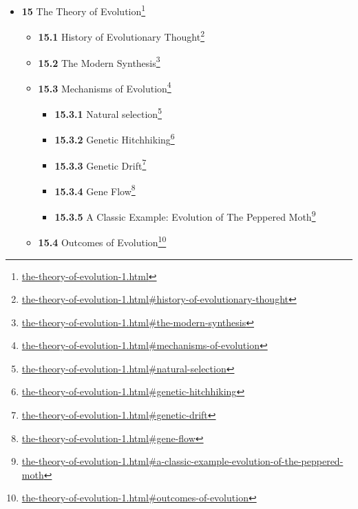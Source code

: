 \documentclass[
]{article}
\providecommand{\tightlist}{%
  \setlength{\itemsep}{0pt}\setlength{\parskip}{0pt}}
\providecommand{\tightlist}{%
  \setlength{\itemsep}{0pt}\setlength{\parskip}{0pt}}
\let\rmarkdownfootnote\footnote%
\def\footnote{\protect\rmarkdownfootnote}
\renewcommand{\href}[2]{#2\footnote{\url{#1}}}
\theoremstyle{definition}
\theoremstyle{definition}
\theoremstyle{definition}
\theoremstyle{remark}
\begin{document}
\begin{itemize}
  \begin{itemize}
  \tightlist
  \item
    \href{protists.html\#protozoa}{\emph{}\textbf{14.1} Protozoa}
  \item
    \href{protists.html\#flagellates}{\emph{}\textbf{14.2} Flagellates}
  \item
    \href{protists.html\#ciliates}{\emph{}\textbf{14.3} Ciliates}
  \item
    \href{protists.html\#amoebozoa}{\emph{}\textbf{14.4} Amoebozoa}
  \item
    \href{protists.html\#algae}{\emph{}\textbf{14.5} Algae}
  \item
    \href{protists.html\#slime-molds}{\emph{}\textbf{14.6} Slime Molds}

    \begin{itemize}
    \tightlist
    \item
      \href{protists.html\#reproduction-of-protists}{\emph{}\textbf{14.6.1}
      Reproduction of Protists}
    \end{itemize}
  \end{itemize}
\item
  \href{the-theory-of-evolution-1.html}{\emph{}\textbf{15} The Theory of
  Evolution}

  \begin{itemize}
  \tightlist
  \item
    \href{the-theory-of-evolution-1.html\#history-of-evolutionary-thought}{\emph{}\textbf{15.1}
    History of Evolutionary Thought}
  \item
    \href{the-theory-of-evolution-1.html\#the-modern-synthesis}{\emph{}\textbf{15.2}
    The Modern Synthesis}
  \item
    \href{the-theory-of-evolution-1.html\#mechanisms-of-evolution}{\emph{}\textbf{15.3}
    Mechanisms of Evolution}

    \begin{itemize}
    \tightlist
    \item
      \href{the-theory-of-evolution-1.html\#natural-selection}{\emph{}\textbf{15.3.1}
      Natural selection}
    \item
      \href{the-theory-of-evolution-1.html\#genetic-hitchhiking}{\emph{}\textbf{15.3.2}
      Genetic Hitchhiking}
    \item
      \href{the-theory-of-evolution-1.html\#genetic-drift}{\emph{}\textbf{15.3.3}
      Genetic Drift}
    \item
      \href{the-theory-of-evolution-1.html\#gene-flow}{\emph{}\textbf{15.3.4}
      Gene Flow}
    \item
      \href{the-theory-of-evolution-1.html\#a-classic-example-evolution-of-the-peppered-moth}{\emph{}\textbf{15.3.5}
      A Classic Example: Evolution of The Peppered Moth}
    \end{itemize}
  \item
    \href{the-theory-of-evolution-1.html\#outcomes-of-evolution}{\emph{}\textbf{15.4}
    Outcomes of Evolution}


\end{itemize}
\end{itemize}
\end{document}
